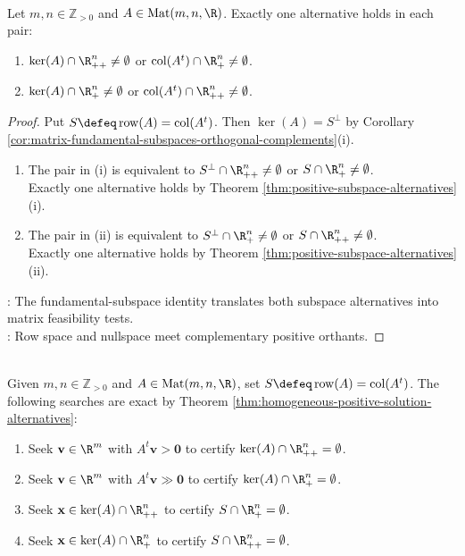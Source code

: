 \begin{theorem} \label{thm:homogeneous-positive-solution-alternatives} \\
Let $m,n\in\mathbb{Z}_{>0}$ and $A\in\operatorname{Mat}(m,n,\R)$. Exactly one alternative holds in each pair:
\begin{enumerate}[label=(\roman*)]
\setlength{\itemsep}{0pt}
\item $\ker(A)\cap\R_{++}^n\neq\emptyset$ or $\operatorname{col}(A^t)\cap\R_+^n\neq\emptyset$.
\item $\ker(A)\cap\R_+^n\neq\emptyset$ or $\operatorname{col}(A^t)\cap\R_{++}^n\neq\emptyset$.
\end{enumerate}
\begin{proof}
Put $S\defeq\operatorname{row}(A)=\operatorname{col}(A^t)$. Then $\ker(A)=S^\perp$ by Corollary \ref{cor:matrix-fundamental-subspaces-orthogonal-complements}(i).
\begin{enumerate}[label=(\roman*)]
\setlength{\itemsep}{0pt}
\item The pair in (i) is equivalent to $S^\perp\cap\R_{++}^n\neq\emptyset$ or $S\cap\R_+^n\neq\emptyset$.\\
Exactly one alternative holds by Theorem \ref{thm:positive-subspace-alternatives}(i).
\item The pair in (ii) is equivalent to $S^\perp\cap\R_+^n\neq\emptyset$ or $S\cap\R_{++}^n\neq\emptyset$.\\
Exactly one alternative holds by Theorem \ref{thm:positive-subspace-alternatives}(ii).
\end{enumerate}
: The fundamental-subspace identity translates both subspace alternatives into matrix feasibility tests.\\
: Row space and nullspace meet complementary positive orthants.
\end{proof}
\end{theorem}

\begin{computationmethod} \label{meth:positive-solution-certificates} \\
Given $m,n\in\mathbb{Z}_{>0}$ and $A\in\operatorname{Mat}(m,n,\R)$, set $S\defeq\operatorname{row}(A)=\operatorname{col}(A^t)$. The following searches are exact by Theorem \ref{thm:homogeneous-positive-solution-alternatives}:
\begin{enumerate}[label=(\roman*)]
\setlength{\itemsep}{0pt}
\item Seek $\mathbf{v}\in\R^m$ with $A^t\mathbf{v}>\mathbf{0}$ to certify $\ker(A)\cap\R_{++}^n=\emptyset$.
\item Seek $\mathbf{v}\in\R^m$ with $A^t\mathbf{v}\gg\mathbf{0}$ to certify $\ker(A)\cap\R_+^n=\emptyset$.
\item Seek $\mathbf{x}\in\ker(A)\cap\R_{++}^n$ to certify $S\cap\R_+^n=\emptyset$.
\item Seek $\mathbf{x}\in\ker(A)\cap\R_+^n$ to certify $S\cap\R_{++}^n=\emptyset$.
\end{enumerate}
\end{computationmethod}

